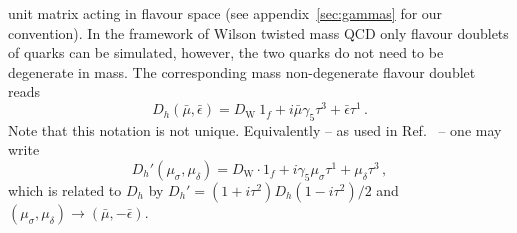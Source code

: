 unit matrix acting in flavour space (see appendix~\ref{sec:gammas} for
our convention). In the framework of Wilson twisted mass QCD only
flavour doublets of quarks can be simulated, however, the two quarks
do not need to be degenerate in mass. The corresponding mass
non-degenerate flavour doublet reads~\cite{Frezzotti:2003xj}
\begin{equation}
  \label{eq:Dh}
  D_h(\bar\mu, \bar\epsilon)  = D_\mathrm{W}\ 1_f +
  i\bar\mu\gamma_5\tau^3 + \bar\epsilon \tau^1 \, .
\end{equation}
Note that this notation is not unique. Equivalently -- as used in
Ref.~\cite{Chiarappa:2006ae} -- one may write
\begin{equation}
  \label{eq:altDh}
  D_h'(\mu_\sigma,\mu_\delta) = D_\mathrm{W}\cdot 1_f +
  i\gamma_5\mu_\sigma\tau^1 + \mu_\delta \tau^3\, ,
\end{equation}
which is related to $D_h$ by $D_h' = (1+i\tau^2)D_h(1-i\tau^2)/2$
and $(\mu_\sigma,\mu_\delta)\to(\bar\mu, -\bar\epsilon)$. 

